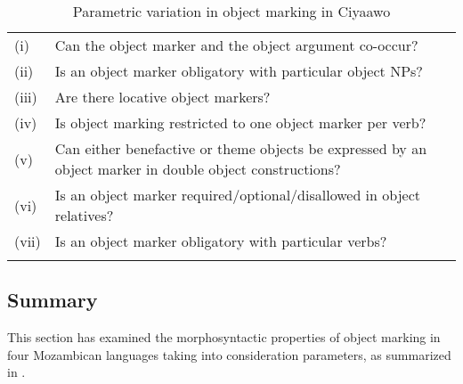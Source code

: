\documentclass[output=paper]{langscibook}
\begin{document}
\begin{table}
\caption{\label{tab:ngunga:5} Parametric variation in object marking in Ciyaawo}


\begin{tabularx}{\textwidth}{l@{~}Ql}

\lsptoprule

(i) & Can the object marker and the object argument co-occur? & \\
(ii) & Is an object marker obligatory with particular object NPs? & \\
(iii) & Are there locative object markers? & \\
(iv) & Is object marking restricted to one object marker per verb? & \\
(v) & Can either benefactive or theme objects be expressed by an object marker in double object constructions? & \\
(vi) & Is an object marker required/optional\slash disallowed in object relatives? & \\
(vii) & Is an object marker obligatory with particular verbs? & \\
\lspbottomrule
\end{tabularx}
\end{table}

\subsection{Summary}\label{sec:ngunga:3.5}

This section has examined the morphosyntactic properties of object marking in four Mozambican languages taking into consideration  parameters, as summarized in . 
\end{document}
